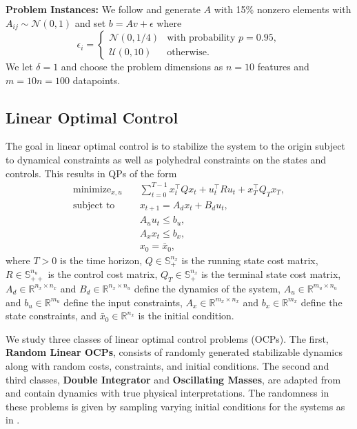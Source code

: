 \documentclass{article} %
\newcommand{\R}{\mathbb{R}}
\DeclareMathOperator*{\minimize}{minimize}
\DeclareMathOperator*{\st}{subject\ to}
\begin{document}
\textbf{Problem Instances:}
We follow \citet{stellato2020osqp} and generate $A$ with 15\% nonzero elements with $A_{ij} \sim \mathcal{N}(0, 1)$ and set $b = Av + \epsilon$ where
\begin{equation}
    \epsilon_i = \begin{cases}
        \mathcal{N}(0, 1/4) & \text{with probability } p = 0.95, \\
        \mathcal{U}(0, 10) & \text{otherwise}.
    \end{cases}
\end{equation}
We let $\delta = 1$ and choose the problem dimensions as $n=10$ features and $m=10n=100$ datapoints.

\subsection{Linear Optimal Control}
The goal in linear optimal control is to stabilize the system to the origin subject to dynamical constraints as well as polyhedral constraints on the states and controls. This results in QPs of the form
\begin{subequations}
\begin{align}
    \minimize_{x, u} \quad & \sum_{t = 0}^{T - 1} x_t^\top Q x_t + u_t^\top R u_t + x_T^\top Q_T x_T, \\
    \st \quad & x_{t + 1} = A_d x_t + B_d u_t, \\
    & A_u u_t \leq b_u, \\
    & A_x x_t \leq b_x, \\
    & x_0 = \bar{x}_0,
\end{align}
\end{subequations}
where $T > 0$ is the time horizon, $Q \in \mathbb{S}_+^{n_x}$ is the running state cost matrix, $R \in \mathbb{S}_{++}^{n_u}$ is the control cost matrix, $Q_T \in \mathbb{S}_+^{n_x}$ is the terminal state cost matrix, $A_d \in \R^{n_x \times n_x}$ and $B_d \in \R^{n_x \times n_u}$ define the dynamics of the system, $A_u \in \R^{m_u \times n_u}$ and $b_u \in \R^{m_u}$ define the input constraints, $A_x \in \R^{m_x \times n_x}$ and $b_x \in \R^{m_x}$ define the state constraints, and $\bar{x}_0 \in \R^{n_x}$ is the initial condition.

We study three classes of linear optimal control problems (OCPs). The first, \textbf{Random Linear OCPs}, consists of randomly generated stabilizable dynamics along with random costs, constraints, and initial conditions. The second and third classes, \textbf{Double Integrator} and \textbf{Oscillating Masses}, are adapted from \citet{chen2022large} and contain dynamics with true physical interpretations. The randomness in these problems is given by sampling varying initial conditions for the systems as in \citet{saravanos2025deep}.
\end{document}
